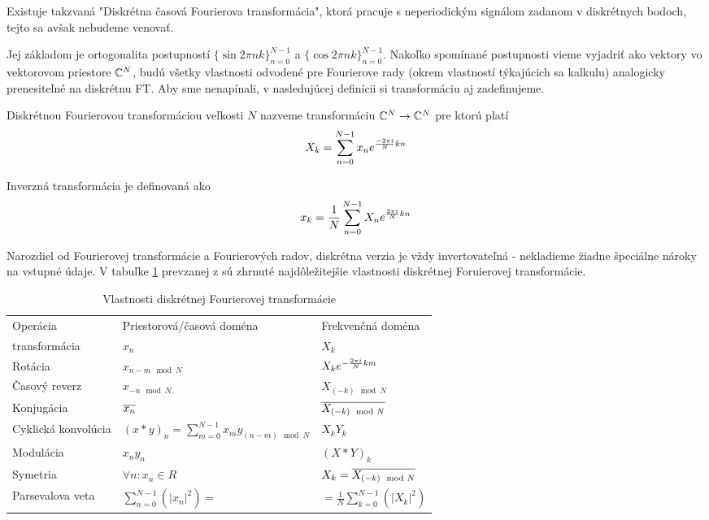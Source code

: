 \begin{poznamka}
    Existuje takzvaná "Diskrétna časová Fourierova transformácia",
    ktorá pracuje s neperiodickým signálom zadanom v diskrétnych
    bodoch, tejto sa avšak nebudeme venovať.
\end{poznamka}

Jej základom je ortogonalita postupností $\{\sin 2\pi n
k\}_{n=0}^{N-1}$ a $\{\cos 2\pi n k\}_{n=0}^{N-1}$. Nakoľko spomínané
postupnosti vieme vyjadriť ako vektory vo vektorovom priestore
$\mathbb{C}^N$, budú všetky vlastnosti odvodené pre Fourierove rady (okrem
vlastností týkajúcich sa kalkulu) analogicky prenesiteľné na diskrétnu
FT. Aby sme nenapínali, v nasledujúcej definícii si transformáciu aj
zadefinujeme.

\begin{definicia}
        Diskrétnou Fourierovou transformáciou veľkosti $N$ nazveme 
        transformáciu $\mathbb{C}^N\rightarrow\mathbb{C}^N$ pre ktorú platí
        \begin{equation*}
            X_k = \sum_{n=0}^{N-1} x_n e^{\frac{-2\pi\hat{\imath}}{N} k n}
        \end{equation*}
\end{definicia}

Inverzná transformácia je definovaná ako
\begin{equation*}
    x_k = \frac{1}{N} \sum_{n=0}^{N-1} X_n e^{\frac{2\pi\hat{\imath}}{N} kn}
\end{equation*}

Narozdiel od Fourierovej transformácie a Fourierových radov, diskrétna
verzia je vždy invertovateľná - nekladieme žiadne špeciálne nároky na
vstupné údaje.
V tabuľke \ref{tab:dft_properties} prevzanej z \cite{dft_properties}
sú zhrnuté najdôležitejšie vlastnosti diskrétnej Foruierovej
transformácie.
\begin{table}
    \centering
    \begin{tabular}{lll}
    Operácia&Priestorová/časová doména&Frekvenčná doména\\
    transformácia&$x_n$&$X_k$\\
    Rotácia&$x_{n-m \mod N}$&$X_k e^{-\frac{2 \pi\hat{\imath}}{N} k m}$\\
    Časový reverz&$x_{-n \mod N}$&
        $X_{(-k) \mod N}$\\
    Konjugácia&$\overline{x_n}$&
        $\overline{X_{(-k) \mod N}}$\\
    Cyklická konvolúcia&
        $(x*y)_n= \sum_{m=0}^{N-1} x_m y_{(n-m)\mod N}$&
        $X_k Y_k$\\
    Modulácia&
        $x_n y_n$& $ (X*Y)_k$\\
    Symetria&
        $\forall n:x_n\in R$&
        $X_k = \overline{X_{(-k)\mod N}}$\\
    Parsevalova veta&
        $\sum_{n=0}^{N-1}( |x_n|^2)=$&
        $=\frac{1}{N} \sum_{k=0}^{N-1}(|X_k|^2)$
    \end{tabular}

    \caption{Vlastnosti diskrétnej Fourierovej transformácie}
    \label{tab:dft_properties}

\end{table}
